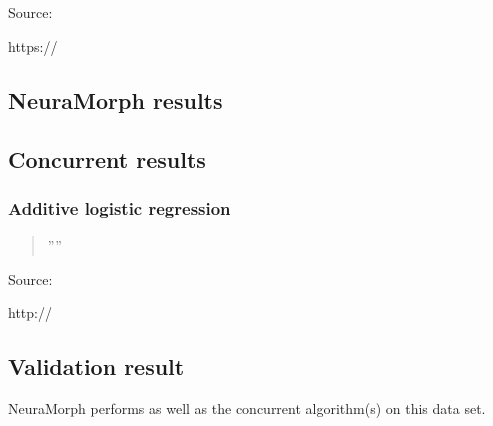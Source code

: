 \documentclass[8pt, a4paper]{article}
\begin{document}
\newpage
\section{}

Source: 

https://

\subsection{NeuraMorph results}

%

\subsection{Concurrent results}

\subsubsection{Additive logistic regression}

\begin{quote}
''''
\end{quote}

Source:

http://

\subsection{Validation result}

NeuraMorph performs as well as the concurrent algorithm(s) on this data set.
\end{document}
